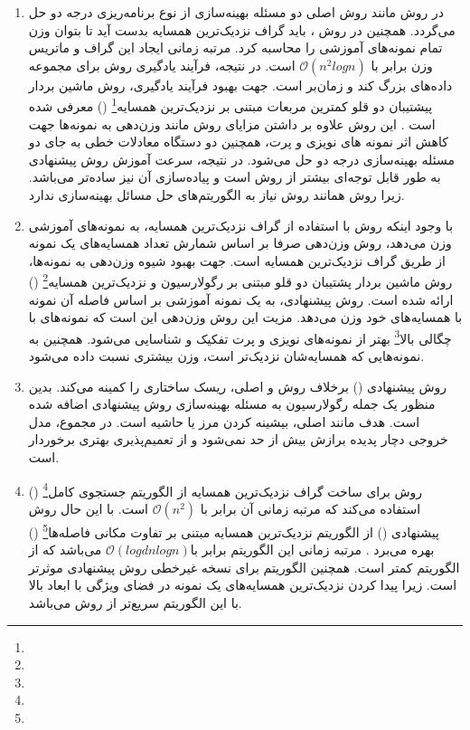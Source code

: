 \begin{enumerate}
	\item 	در روش  مانند روش  اصلی دو مسئله بهینه‌سازی از نوع برنامه‌ریزی درجه دو حل می‌گردد. همچنین در روش ، باید گراف نزدیک‌ترین همسایه بدست آید تا بتوان وزن تمام نمونه‌های آموزشی را محاسبه کرد. مرتبه زمانی ایجاد این گراف و ماتریس وزن برابر با $\mathcal{O}(n^{2}logn)$ است. در نتیجه، فرآیند یادگیری روش  برای مجموعه داده‌های بزرگ کند و زمان‌بر است. جهت بهبود فرآیند یادگیری، روش ماشین بردار پیشتیبان دو قلو کمترین مربعات مبتنی بر نزدیک‌ترین همسایه\footnote{}  () معرفی شده است \cite{mir2018}. این روش علاوه بر داشتن مزایای روش  مانند وزن‌دهی به نمونه‌ها جهت کاهش اثر نمونه های نویزی و پرت، همچنین دو دستگاه معادلات خطی به جای دو مسئله بهینه‌سازی درجه دو حل می‌شود. در نتیجه، سرعت آموزش روش پیشنهادی به طور قابل توجه‌ای بیشتر از روش  است و پیاده‌سازی آن نیز ساده‌تر می‌باشد. زیرا روش  همانند روش   نیاز به الگوریتم‌های حل مسائل بهینه‌سازی ندارد.
	\item با وجود اینکه روش  با استفاده از گراف نزدیک‌ترین همسایه، به نمونه‌های آموزشی وزن می‌دهد، روش وزن‌دهی صرفا بر اساس شمارش تعداد همسایه‌های یک نمونه از طریق گراف نزدیک‌ترین همسایه است.  جهت بهبود شیوه وزن‌دهی به نمونه‌ها، روش ماشین بردار پشتیبان دو قلو مبتنی بر رگولارسیون و نزدیک‌ترین همسایه\footnote{}  () ارائه شده است. روش پیشنهادی، به یک نمونه آموزشی بر اساس فاصله آن نمونه با همسایه‌های خود وزن می‌دهد. مزیت این روش وزن‌دهی این است که نمونه‌های با چگالی بالا\footnote{} بهتر از نمونه‌های نویزی و پرت تفکیک و شناسایی می‌شود. همچنین به نمونه‌هایی که همسایه‌شان نزدیک‌تر است، وزن بیشتری نسبت داده می‌شود.
	\item روش پیشنهادی () برخلاف روش  و  اصلی، ریسک ساختاری را کمینه می‌کند. بدین منظور یک جمله رگولارسیون به مسئله بهینه‌سازی روش پیشنهادی اضافه شده است. هدف مانند  اصلی، بیشینه کردن مرز یا حاشیه است. در مجموع، مدل خروجی دچار پدیده برازش بیش از حد نمی‌شود و از تعمیم‌پذیری بهتری برخوردار است.
	\item	روش  برای ساخت گراف نزدیک‌ترین همسایه از الگوریتم جستجوی کامل\footnote{}  () استفاده می‌کند که مرتبه زمانی آن برابر با $\mathcal{O}(n^{2})$ است. با این حال روش پیشنهادی () از الگوریتم نزدیک‌ترین همسایه مبتنی بر تفاوت مکانی فاصله‌ها\footnote{}  () بهره می‌برد \cite{xia2015}. مرتبه زمانی این الگوریتم برابر با$\mathcal{O}(log d n log n)$  می‌باشد که از الگوریتم  کمتر است. همچنین الگوریتم  برای نسخه غیرخطی روش پیشنهادی موثرتر است. زیرا پیدا کردن نزدیک‌ترین همسایه‌های یک نمونه در فضای ویژگی با ابعاد بالا با این الگوریتم سریع‌تر از روش  می‌باشد.
\end{enumerate}

